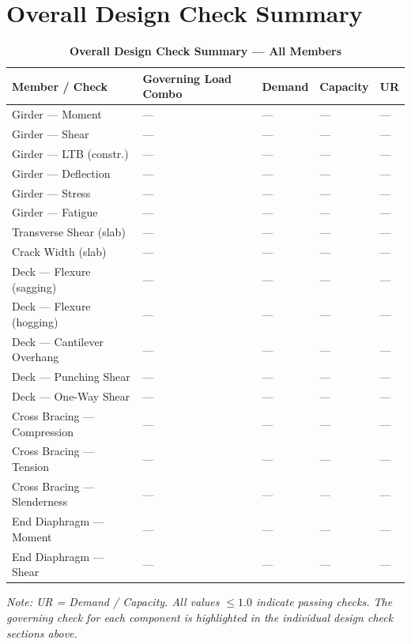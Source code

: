 \documentclass[12pt,a4paper]{report}
\numberwithin{table}{chapter}
\numberwithin{figure}{chapter}
\begin{document}
\section{Overall Design Check Summary}
\label{sec:overall-summary}

\vspace{1em}
\begin{longtable}{|C{3.4cm}|L{4.5cm}|C{2.3cm}|C{2.3cm}|>{\centering\arraybackslash}p{1.6cm}|}
\caption{\textbf{Overall Design Check Summary --- All Members}}
\hline
\textbf{Member / Check} & \textbf{Governing Load Combo} & \textbf{Demand} & \textbf{Capacity} & \textbf{UR} \\[6pt]
\hline
Girder --- Moment & --- & --- & --- & --- \\[6pt]
\hline
Girder --- Shear & --- & --- & --- & --- \\[6pt]
\hline
Girder --- LTB (constr.) & --- & --- & --- & --- \\[6pt]
\hline
Girder --- Deflection & --- & --- & --- & --- \\[6pt]
\hline
Girder --- Stress & --- & --- & --- & --- \\[6pt]
\hline
Girder --- Fatigue & --- & --- & --- & --- \\[6pt]
\hline
Transverse Shear (slab) & --- & --- & --- & --- \\[6pt]
\hline
Crack Width (slab) & --- & --- & --- & --- \\[6pt]
\hline
Deck --- Flexure (sagging) & --- & --- & --- & --- \\[6pt]
\hline
Deck --- Flexure (hogging) & --- & --- & --- & --- \\[6pt]
\hline
Deck --- Cantilever Overhang & --- & --- & --- & --- \\[6pt]
\hline
Deck --- Punching Shear & --- & --- & --- & --- \\[6pt]
\hline
Deck --- One-Way Shear & --- & --- & --- & --- \\[6pt]
\hline
Cross Bracing --- Compression & --- & --- & --- & --- \\[6pt]
\hline
Cross Bracing --- Tension & --- & --- & --- & --- \\[6pt]
\hline
Cross Bracing --- Slenderness & --- & --- & --- & --- \\[6pt]
\hline
End Diaphragm --- Moment & --- & --- & --- & --- \\[6pt]
\hline
End Diaphragm --- Shear & --- & --- & --- & --- \\[6pt]
\hline
\end{longtable}
\noindent\textit{Note: UR = Demand / Capacity. All values $\leq 1.0$ indicate passing checks. The governing check for each component is highlighted in the individual design check sections above.}
\end{document}
